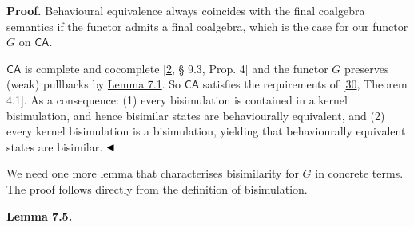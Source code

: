 \par\medskip
\hypertarget{html:S7.SS0.SSS0.P0.SPx3}{} \par\noindent\textbf{Proof.}\quad  %
\hypertarget{html:S7.SS0.SSS0.P0.SPx3.p1}{} Behavioural equivalence always coincides with the final coalgebra semantics if the functor admits a final coalgebra, which is the case for our functor %
\hypertarget{html:S7.SS0.SSS0.P0.SPx3.p1.m1}{}\({G}\) on %
\hypertarget{html:S7.SS0.SSS0.P0.SPx3.p1.m2}{}\({\mathsf{CA}}\).
\par\medskip
\hypertarget{html:S7.SS0.SSS0.P0.SPx3.p2}{} %
\hypertarget{html:S7.SS0.SSS0.P0.SPx3.p2.m1}{}\({\mathsf{CA}}\) is complete and cocomplete [\hyperlink{html:bib.bib2}{2}, § 9.3, Prop. 4] and the functor %
\hypertarget{html:S7.SS0.SSS0.P0.SPx3.p2.m2}{}\({G}\) preserves (weak) pullbacks by \hyperlink{html:S7.Thmtheorem1}{Lemma 7.1}. So %
\hypertarget{html:S7.SS0.SSS0.P0.SPx3.p2.m3}{}\({\mathsf{CA}}\) satisfies the requirements of [\hyperlink{html:bib.bib30}{30}, Theorem 4.1]. As a consequence: (1) every bisimulation is contained in a kernel bisimulation, and hence bisimilar states are behaviourally equivalent, and (2) every kernel bisimulation is a bisimulation, yielding that behaviourally equivalent states are bisimilar. %
\hypertarget{html:S7.SS0.SSS0.P0.SPx3.p2.m4}{}\({\hfill\blacktriangleleft}\)
\par\medskip
\hypertarget{html:S7.SS0.SSS0.P0.SPx3.p3}{} We need one more lemma that characterises bisimilarity for %
\hypertarget{html:S7.SS0.SSS0.P0.SPx3.p3.m1}{}\({G}\) in concrete terms. The proof follows directly from the definition of bisimulation.
\par\medskip
\hypertarget{html:S7.Thmtheorem5}{} \par\noindent\textbf{\textbf{Lemma 7.5}\textbf{.}}\quad  %
